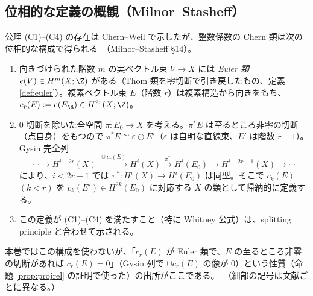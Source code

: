 \subsection{位相的な定義の概観（Milnor--Stasheff）}
公理 (C1)--(C4) の存在は Chern--Weil で示したが、整数係数の Chern 類は次の位相的な構成で得られる\tC\ （Milnor--Stasheff §14）。
\begin{enumerate}
\item 向きづけられた階数 $m$ の実ベクトル束 $V\to X$ には \emph{Euler 類} $e(V)\in H^m(X;\Z)$ がある（Thom 類を零切断で引き戻したもの、定義 \ref{def:euler}）。複素ベクトル束 $E$（階数 $r$）は複素構造から向きをもち、$c_r(E):=e(E_\R)\in H^{2r}(X;\Z)$。
\item $0$ 切断を除いた全空間 $\pi:E_0\to X$ を考える。$\pi^*E$ は至るところ非零の切断（点自身）をもつので $\pi^*E\cong\varepsilon\oplus E'$（$\varepsilon$ は自明な直線束、$E'$ は階数 $r-1$）。Gysin 完全列
\[
\cdots\to H^{i-2r}(X)\xrightarrow{\ \cup c_r(E)\ }H^i(X)\xrightarrow{\ \pi^*\ }H^i(E_0)\to H^{i-2r+1}(X)\to\cdots
\]
により、$i<2r-1$ では $\pi^*:H^i(X)\to H^i(E_0)$ は同型。そこで $c_k(E)$ $(k<r)$ を $c_k(E')\in H^{2k}(E_0)$ に対応する $X$ の類として帰納的に定義する。
\item この定義が (C1)--(C4) を満たすこと（特に Whitney 公式）は、splitting principle と合わせて示される。
\end{enumerate}
本巻ではこの構成を使わないが、「$c_r(E)$ が Euler 類で、$E$ の至るところ非零の切断があれば $c_r(E)=0$」（Gysin 列で $\cup c_r(E)$ の像が $0$）という性質（命題 \ref{prop:projrel} の証明で使った）の出所がここである。\tQ\ （細部の記号は文献ごとに異なる。）
